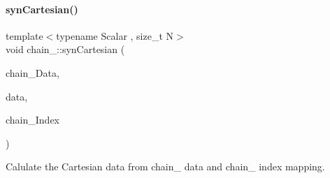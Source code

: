 \paragraph{\texorpdfstring{syn\+Cartesian()}{synCartesian()}}
{\footnotesize\ttfamily template$<$typename Scalar , size\+\_\+t N$>$ \\
void chain_\+::syn\+Cartesian (\begin{DoxyParamCaption}\item[{\mbox{\hyperlink{namespacechain_aa715d2f046187ea9f0c3ea55605d6214}{Vector\+Array}}$<$ Scalar, N $>$ \&}]{chain_\+Data,  }\item[{\mbox{\hyperlink{namespacechain_aa715d2f046187ea9f0c3ea55605d6214}{Vector\+Array}}$<$ Scalar, N $>$ \&}]{data,  }\item[{\mbox{\hyperlink{namespacechain_aa40d2da395c0ac2bc5f37832442ac403}{Index\+Array}}$<$ N $>$ \&}]{chain_\+Index }\end{DoxyParamCaption})}



Calulate the Cartesian data from chain_ data and chain_ index mapping.


